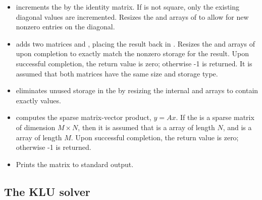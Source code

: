 \begin{itemize}
\item {}
  \par {} increments the  
  by the identity matrix.  If  is not square, only the existing
  diagonal values are incremented.  Resizes the  and
   arrays of  to allow for new 
  nonzero entries on the diagonal.

\item {}
  \par {} adds two  matrices  and
  , placing the result back in .  Resizes the 
  and  arrays of  upon completion to exactly match
  the nonzero storage for the result.  Upon successful completion, the
  return value is zero; otherwise -1 is returned. It is assumed that
  both matrices have the same size and storage type.

\item {}
  \par {} eliminates unused storage in the
    by resizing the internal  and
   arrays to contain exactly  values.

\item {}
  \par {} computes the sparse matrix-vector
  product, $y=Ax$.  If the   
  is a sparse matrix of dimension $M\times N$, then it is assumed
  that  is a  array of length $N$, and  is a
   array of length $M$. Upon successful completion, the
  return value is zero; otherwise -1 is returned.

\item {}
  \par {} Prints the  matrix  to
  standard output.

\end{itemize}



\subsection{The KLU solver}\label{ss:klu}


